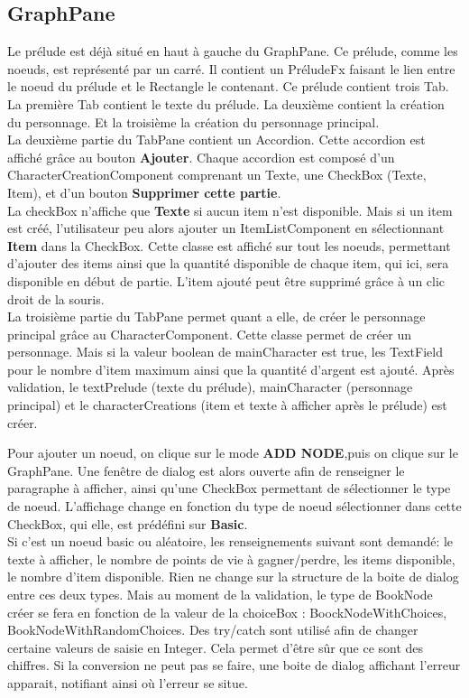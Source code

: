 		\subsection{GraphPane}

			Le prélude est déjà situé en haut à gauche du GraphPane. Ce prélude, comme les noeuds, est représenté par un carré. Il contient un PréludeFx faisant le lien entre le noeud du prélude et le Rectangle le contenant. Ce prélude contient trois Tab. La première Tab contient le texte du prélude. La deuxième contient la création du personnage. Et la troisième la création du personnage principal.\\
			La deuxième partie du TabPane contient un Accordion. Cette accordion est affiché grâce au bouton \textbf{Ajouter}. Chaque accordion est composé d'un CharacterCreationComponent comprenant un Texte, une CheckBox (Texte, Item), et d'un bouton \textbf{Supprimer cette partie}.\\


			La checkBox n'affiche que \textbf{Texte} si aucun item n'est disponible. Mais si un item est créé, l'utilisateur peu alors ajouter un ItemListComponent en sélectionnant \textbf{Item} dans la CheckBox. Cette classe est affiché sur tout les noeuds, permettant d'ajouter des items ainsi que la quantité disponible de chaque item, qui ici, sera disponible en début de partie. L'item ajouté peut être supprimé grâce à un clic droit de la souris.\\



			La troisième partie du TabPane permet quant a elle, de créer le personnage principal grâce au CharacterComponent. Cette classe permet de créer un personnage. Mais si la valeur boolean de mainCharacter est true, les TextField pour le nombre d'item maximum ainsi que la quantité d'argent est ajouté.
			Après validation, le textPrelude (texte du prélude), mainCharacter (personnage principal) et le characterCreations (item et texte à afficher après le prélude) est créer.


			Pour ajouter un noeud, on clique sur le mode \textbf{ADD NODE},puis on clique sur le GraphPane. Une fenêtre de dialog est alors ouverte afin de renseigner le paragraphe à afficher, ainsi qu'une CheckBox permettant de sélectionner le type de noeud. L'affichage change en fonction du type de noeud sélectionner dans cette CheckBox, qui elle, est prédéfini sur \textbf{Basic}.\\

			Si c'est un noeud basic ou aléatoire, les renseignements suivant sont demandé: le texte à afficher, le nombre de points de vie à gagner/perdre, les items disponible, le nombre d'item disponible. Rien ne change sur la structure de la boite de dialog entre ces deux types. Mais au moment de la validation, le type de BookNode créer se fera en fonction de la valeur de la choiceBox : BoockNodeWithChoices, BookNodeWithRandomChoices. Des try/catch sont utilisé afin de changer certaine valeurs de saisie en Integer. Cela permet d'être sûr que ce sont des chiffres. Si la conversion ne peut pas se faire, une boite de dialog affichant l'erreur apparait, notifiant ainsi où l'erreur se situe.\\

